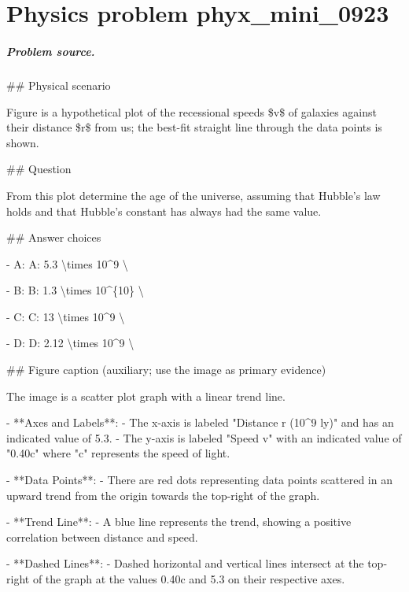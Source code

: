 
\chapter{Physics problem phyx\_mini\_0923}
\label{ch:PhyXMiniProblems_problem_phyx_mini_0923}

\paragraph{Problem source.}
\#\# Physical scenario

Figure is a hypothetical plot of the recessional speeds \$v\$ of galaxies against their distance \$r\$ from us; the best-fit straight line through the data points is shown.

\#\# Question

From this plot determine the age of the universe, assuming that Hubble's law holds and that Hubble's constant has always had the same value.

\#\# Answer choices

- A: A: 5.3 \textbackslash{}times 10\textasciicircum{}9 \textbackslash{}

- B: B: 1.3 \textbackslash{}times 10\textasciicircum{}\{10\} \textbackslash{}

- C: C: 13 \textbackslash{}times 10\textasciicircum{}9 \textbackslash{}

- D: D: 2.12 \textbackslash{}times 10\textasciicircum{}9 \textbackslash{}

\#\# Figure caption (auxiliary; use the image as primary evidence)

The image is a scatter plot graph with a linear trend line. 

- **Axes and Labels**:
  - The x-axis is labeled "Distance r (10\textasciicircum{}9 ly)" and has an indicated value of 5.3.
  - The y-axis is labeled "Speed v" with an indicated value of "0.40c" where "c" represents the speed of light.

- **Data Points**:
  - There are red dots representing data points scattered in an upward trend from the origin towards the top-right of the graph.

- **Trend Line**:
  - A blue line represents the trend, showing a positive correlation between distance and speed.

- **Dashed Lines**:
  - Dashed horizontal and vertical lines intersect at the top-right of the graph at the values 0.40c and 5.3 on their respective axes.

